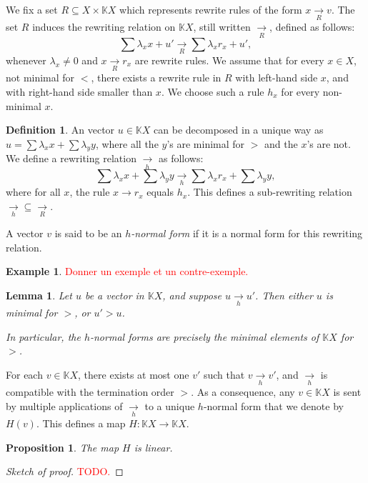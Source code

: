 \documentclass[10pt]{easychair}
\newtheorem{lemma}[theorem]{Lemma}
\newtheorem{proposition}[theorem]{Proposition}
\theoremstyle{definition}
\newtheorem{definition}[theorem]{Definition}
\newtheorem{example}[theorem]{Example}
\newcommand\K{\mathbb{K}}
\newcommand\KX{\K X}
\newcommand\rewR{\underset{R}{\longrightarrow}}
\newcommand\rewh{\underset{h}{\longrightarrow}}
\newcommand\todo[1]{\textcolor{red}{#1.}}
\begin{document}
We fix a set $R\subseteq X\times\KX$ which represents rewrite rules of
the form $x\rewR v$. The set $R$ induces the rewriting relation on $\KX$,
still written $\rewR$, defined as follows:
\begin{equation}\label{equ:rewrite_step}
  \sum\lambda_xx+u'\rewR\sum\lambda_xr_x+u',
\end{equation}
whenever $\lambda_x\neq 0$ and $x\rewR r_x$ are rewrite rules. We assume
that for every $x\in X$, not minimal for $<$, there exists a rewrite rule
in $R$ with left-hand side $x$, and with right-hand side smaller than $x$. We choose such a rule $h_x$ for every
non-minimal $x$.
\begin{definition}
An vector $u \in \KX$ can be decomposed in a unique way as $u = \sum \lambda_xx+\sum \lambda_yy$, where all the $y$'s are minimal for $>$ and the $x$'s are not. We define a rewriting relation $\rewh$ as follows:
\[
  \sum\lambda_xx+\sum\lambda_yy\rewh\sum\lambda_xr_x+\sum\lambda_yy,
\]
where for all $x$, the rule $x \to r_x$ equals $h_x$.
This defines a sub-rewriting relation $\rewh \subseteq \rewR$.

A vector $v$ is said to be an \emph{$h$-normal form} if it is a normal form for this rewriting relation.
\end{definition}


\begin{example}
\todo{Donner un exemple et un contre-exemple}
\end{example}


\begin{lemma}\label{lemma:h_normal_forms}
Let $u$ be a vector in $\KX$, and suppose $u \rewh u'$. Then either $u$ is minimal for $>$, or $u' > u$. 

In particular, the $h$-normal forms are precisely the minimal elements of $\KX$ for $>$.
\end{lemma}

For each $v\in\KX$, there exists at most one $v'$ such that $v \rewh v'$, and $\rewh$ is compatible with the termination order $>$. As a consequence, any $v \in \KX$ is sent by multiple applications of $\rewh$ to a unique $h$-normal form that we denote by $H(v)$. This defines a map $H : \KX \to \KX$.  

\begin{proposition}\label{prop:linearity_of_H}
  The map $H$ is linear.
\end{proposition}

\begin{proof}[Sketch of proof]
  \todo{TODO}
\end{proof}
\end{document}
